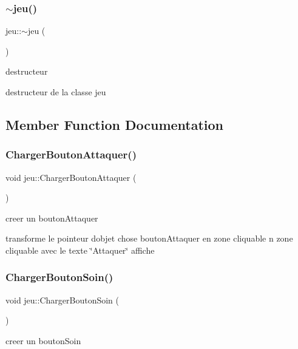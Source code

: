 \subsubsection{\texorpdfstring{$\sim$jeu()}{~jeu()}}
{\footnotesize\ttfamily jeu\+::$\sim$jeu (\begin{DoxyParamCaption}{ }\end{DoxyParamCaption})}



destructeur 

destructeur de la classe jeu 

\subsection{Member Function Documentation}
\mbox{\label{classjeu_a9d82e7f21e8863d1ed8bc7ef7d7aec87}} 
\subsubsection{\texorpdfstring{Charger\+Bouton\+Attaquer()}{ChargerBoutonAttaquer()}}
{\footnotesize\ttfamily void jeu\+::\+Charger\+Bouton\+Attaquer (\begin{DoxyParamCaption}{ }\end{DoxyParamCaption})}



creer un bouton\+Attaquer 

transforme le pointeur d\textquotesingle{}objet chose bouton\+Attaquer en zone cliquable n zone cliquable avec le texte \char`\"{}\+Attaquer\char`\"{} affiche \mbox{\label{classjeu_a176fa4a5355a3529a833592d8f81294e}} 
\subsubsection{\texorpdfstring{Charger\+Bouton\+Soin()}{ChargerBoutonSoin()}}
{\footnotesize\ttfamily void jeu\+::\+Charger\+Bouton\+Soin (\begin{DoxyParamCaption}{ }\end{DoxyParamCaption})}



creer un bouton\+Soin 

